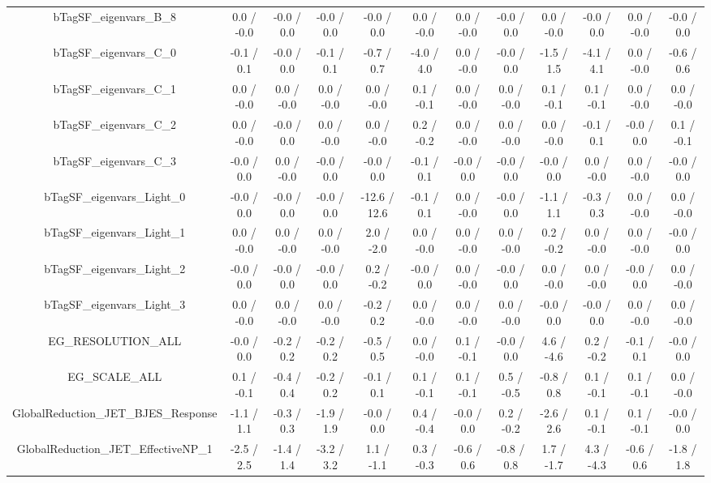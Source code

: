 \begin{table}[htbp]
\begin{center}
\begin{tabular}{|c|c|c|c|c|c|c|c|c|c|c|c|}
  bTagSF_eigenvars_B_8 & 0.0 / -0.0 & -0.0 / 0.0 & -0.0 / 0.0 & -0.0 / 0.0 & 0.0 / -0.0 & 0.0 / -0.0 & -0.0 / 0.0 & 0.0 / -0.0 & -0.0 / 0.0 & 0.0 / -0.0 & -0.0 / 0.0 \\ 
  bTagSF_eigenvars_C_0 & -0.1 / 0.1 & -0.0 / 0.0 & -0.1 / 0.1 & -0.7 / 0.7 & -4.0 / 4.0 & 0.0 / -0.0 & -0.0 / 0.0 & -1.5 / 1.5 & -4.1 / 4.1 & 0.0 / -0.0 & -0.6 / 0.6 \\ 
  bTagSF_eigenvars_C_1 & 0.0 / -0.0 & 0.0 / -0.0 & 0.0 / -0.0 & 0.0 / -0.0 & 0.1 / -0.1 & 0.0 / -0.0 & 0.0 / -0.0 & 0.1 / -0.1 & 0.1 / -0.1 & 0.0 / -0.0 & 0.0 / -0.0 \\ 
  bTagSF_eigenvars_C_2 & 0.0 / -0.0 & -0.0 / 0.0 & 0.0 / -0.0 & 0.0 / -0.0 & 0.2 / -0.2 & 0.0 / -0.0 & 0.0 / -0.0 & 0.0 / -0.0 & -0.1 / 0.1 & -0.0 / 0.0 & 0.1 / -0.1 \\ 
  bTagSF_eigenvars_C_3 & -0.0 / 0.0 & 0.0 / -0.0 & -0.0 / 0.0 & -0.0 / 0.0 & -0.1 / 0.1 & -0.0 / 0.0 & -0.0 / 0.0 & -0.0 / 0.0 & 0.0 / -0.0 & 0.0 / -0.0 & -0.0 / 0.0 \\ 
  bTagSF_eigenvars_Light_0 & -0.0 / 0.0 & -0.0 / 0.0 & -0.0 / 0.0 & -12.6 / 12.6 & -0.1 / 0.1 & 0.0 / -0.0 & -0.0 / 0.0 & -1.1 / 1.1 & -0.3 / 0.3 & 0.0 / -0.0 & 0.0 / -0.0 \\ 
  bTagSF_eigenvars_Light_1 & 0.0 / -0.0 & 0.0 / -0.0 & 0.0 / -0.0 & 2.0 / -2.0 & 0.0 / -0.0 & 0.0 / -0.0 & 0.0 / -0.0 & 0.2 / -0.2 & 0.0 / -0.0 & 0.0 / -0.0 & -0.0 / 0.0 \\ 
  bTagSF_eigenvars_Light_2 & -0.0 / 0.0 & -0.0 / 0.0 & -0.0 / 0.0 & 0.2 / -0.2 & -0.0 / 0.0 & 0.0 / -0.0 & -0.0 / 0.0 & 0.0 / -0.0 & 0.0 / -0.0 & -0.0 / 0.0 & 0.0 / -0.0 \\ 
  bTagSF_eigenvars_Light_3 & 0.0 / -0.0 & 0.0 / -0.0 & 0.0 / -0.0 & -0.2 / 0.2 & 0.0 / -0.0 & 0.0 / -0.0 & 0.0 / -0.0 & -0.0 / 0.0 & -0.0 / 0.0 & 0.0 / -0.0 & 0.0 / -0.0 \\ 
  EG_RESOLUTION_ALL & -0.0 / 0.0 & -0.2 / 0.2 & -0.2 / 0.2 & -0.5 / 0.5 & 0.0 / -0.0 & 0.1 / -0.1 & -0.0 / 0.0 & 4.6 / -4.6 & 0.2 / -0.2 & -0.1 / 0.1 & -0.0 / 0.0 \\ 
  EG_SCALE_ALL & 0.1 / -0.1 & -0.4 / 0.4 & -0.2 / 0.2 & -0.1 / 0.1 & 0.1 / -0.1 & 0.1 / -0.1 & 0.5 / -0.5 & -0.8 / 0.8 & 0.1 / -0.1 & 0.1 / -0.1 & 0.0 / -0.0 \\ 
  GlobalReduction_JET_BJES_Response & -1.1 / 1.1 & -0.3 / 0.3 & -1.9 / 1.9 & -0.0 / 0.0 & 0.4 / -0.4 & -0.0 / 0.0 & 0.2 / -0.2 & -2.6 / 2.6 & 0.1 / -0.1 & 0.1 / -0.1 & -0.0 / 0.0 \\ 
  GlobalReduction_JET_EffectiveNP_1 & -2.5 / 2.5 & -1.4 / 1.4 & -3.2 / 3.2 & 1.1 / -1.1 & 0.3 / -0.3 & -0.6 / 0.6 & -0.8 / 0.8 & 1.7 / -1.7 & 4.3 / -4.3 & -0.6 / 0.6 & -1.8 / 1.8 \\ 

\end{tabular}
\end{center}
\end{table}
